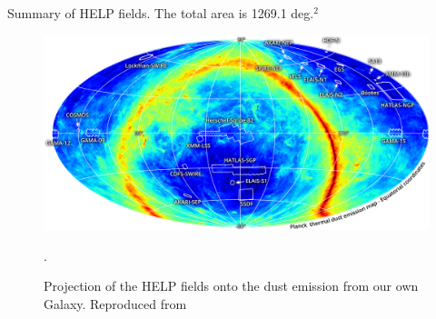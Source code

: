 \documentclass[usenatbib]{mnras}
\begin{document}
\begin{table}
  
  \caption{Summary of HELP fields.  The total area is 1269.1 deg.$^2$}
\end{table}


\begin{figure}
  \centering \includegraphics[width=16cm]{figs/HELP-fields.png}
  \caption[HELP Sky]{Projection of the HELP fields onto the dust emission from
    our own Galaxy. Reproduced from \citet{Shirley:2019}}.\label{fig:helpsky}
\end{figure}


\end{document}
